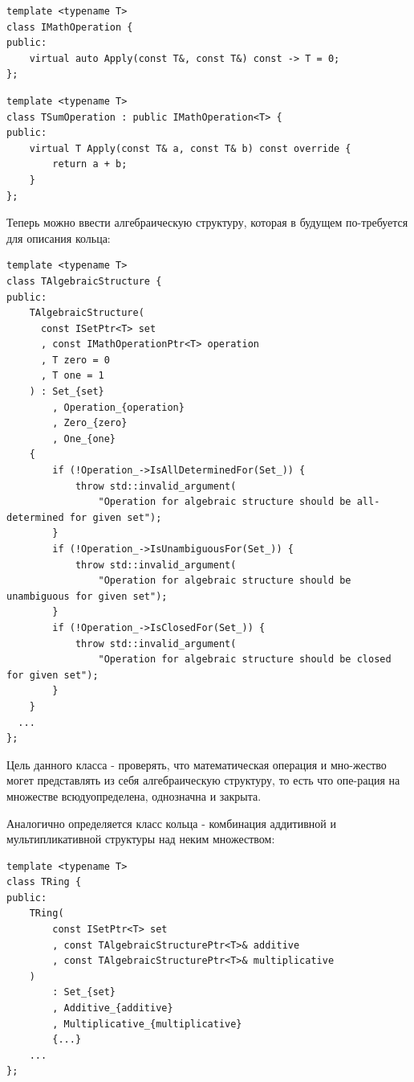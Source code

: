 \documentclass[a4paper]{article}
\newenvironment{code}{\captionsetup{type=listing}}{}
\begin{document}
\begin{code}
\begin{verbatim}
template <typename T>
class IMathOperation {
public:
    virtual auto Apply(const T&, const T&) const -> T = 0;
};
\end{verbatim}
\end{code}

\begin{code}
\begin{verbatim}
template <typename T>
class TSumOperation : public IMathOperation<T> {
public:
    virtual T Apply(const T& a, const T& b) const override {
        return a + b;
    }
};
\end{verbatim}
\end{code}

Теперь можно ввести алгебраическую структуру, которая в будущем по-требуется для описания кольца:

\begin{code}
\begin{verbatim}
template <typename T>
class TAlgebraicStructure {
public:
    TAlgebraicStructure(
      const ISetPtr<T> set
      , const IMathOperationPtr<T> operation
      , T zero = 0
      , T one = 1
    ) : Set_{set}
        , Operation_{operation}
        , Zero_{zero}
        , One_{one}
    {
        if (!Operation_->IsAllDeterminedFor(Set_)) {
            throw std::invalid_argument(
                "Operation for algebraic structure should be all-determined for given set");
        }
        if (!Operation_->IsUnambiguousFor(Set_)) {
            throw std::invalid_argument(
                "Operation for algebraic structure should be unambiguous for given set");
        }
        if (!Operation_->IsClosedFor(Set_)) {
            throw std::invalid_argument(
                "Operation for algebraic structure should be closed for given set");
        }
    }
  ...
};
\end{verbatim}
\end{code}

Цель данного класса - проверять, что математическая операция и мно-жество могет представлять из себя алгебраическую структуру, то есть что опе-рация на множестве всюдуопределена, однозначна и закрыта.

Аналогично определяется класс кольца - комбинация аддитивной и мультипликативной структуры над неким множеством:
\begin{code}
\begin{verbatim}
template <typename T>
class TRing {
public:
    TRing(
        const ISetPtr<T> set
        , const TAlgebraicStructurePtr<T>& additive
        , const TAlgebraicStructurePtr<T>& multiplicative
    )
        : Set_{set}
        , Additive_{additive}
        , Multiplicative_{multiplicative}
        {...}
    ...
};
\end{verbatim}
\end{code}
\end{document}
